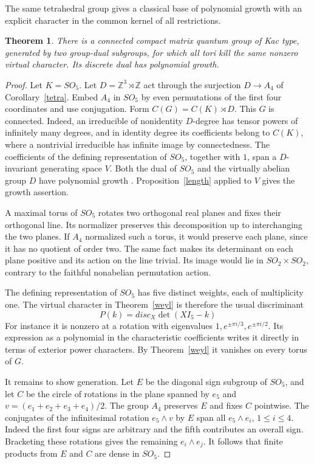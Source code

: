 \documentclass[11pt,a4paper]{article}
\newtheorem{thm}{Theorem}[section]
\theoremstyle{remark}
\begin{document}
The same tetrahedral group gives a classical base of polynomial growth
with an explicit character in the common kernel of all restrictions.
\begin{thm}\label{sofive}
There is a connected compact matrix quantum group of Kac type, generated
by two group-dual subgroups, for which all tori kill the same nonzero
virtual character. Its discrete dual has polynomial growth.
\end{thm}
\begin{proof}
Let $K=SO_5$. Let $D=\mathbb Z^3\rtimes\mathbb Z$ act through the
surjection $D\to A_4$ of Corollary~\ref{tetra}. Embed $A_4$ in $SO_5$
by even permutations of the first four coordinates and use conjugation.
Form $C(G)=C(K)\rtimes D$. This $G$ is connected. Indeed, an
irreducible of nonidentity $D$-degree has tensor powers of infinitely
many degrees, and in identity degree its coefficients belong to $C(K)$,
where a nontrivial irreducible has infinite image by connectedness.
The coefficients of the defining representation of $SO_5$, together
with $1$, span a $D$-invariant generating space $V$. Both the dual of $SO_5$ and the virtually
abelian group $D$ have polynomial growth \cite{dpr}.
Proposition~\ref{length} applied to $V$ gives the growth assertion.

A maximal torus of $SO_5$ rotates two orthogonal real planes and fixes
their orthogonal line. Its normalizer preserves this decomposition up to
interchanging the two planes. If $A_4$ normalized such a torus, it would
preserve each plane, since it has no quotient of order two. The same
fact makes its determinant on each plane positive and its action on
the line trivial. Its image would lie in $SO_2\times SO_2$, contrary
to the faithful nonabelian permutation action.

The defining representation of $SO_5$ has five distinct weights, each
of multiplicity one. The virtual character in Theorem~\ref{weyl} is
therefore the usual discriminant
\[
 P(k)=disc_X\det(XI_5-k)
\]
For instance it is nonzero at a rotation with eigenvalues
$1,e^{\pm\pi i/3},e^{\pm\pi i/2}$. Its expression as a polynomial in
the characteristic coefficients writes it directly in terms of exterior
power characters. By Theorem~\ref{weyl} it vanishes on every torus of $G$.

It remains to show generation. Let $E$ be the diagonal sign subgroup
of $SO_5$, and let $C$ be the circle of rotations in the plane spanned
by $e_5$ and $v=(e_1+e_2+e_3+e_4)/2$. The group $A_4$ preserves $E$
and fixes $C$ pointwise. The conjugates of the infinitesimal rotation
$e_5\wedge v$ by $E$ span all $e_5\wedge e_i$, $1\le i\le4$. Indeed
the first four signs are arbitrary and the fifth contributes an overall
sign. Bracketing these rotations gives the remaining $e_i\wedge e_j$.
It follows that finite products from $E$ and $C$ are dense in $SO_5$.


\end{proof}
\end{document}

